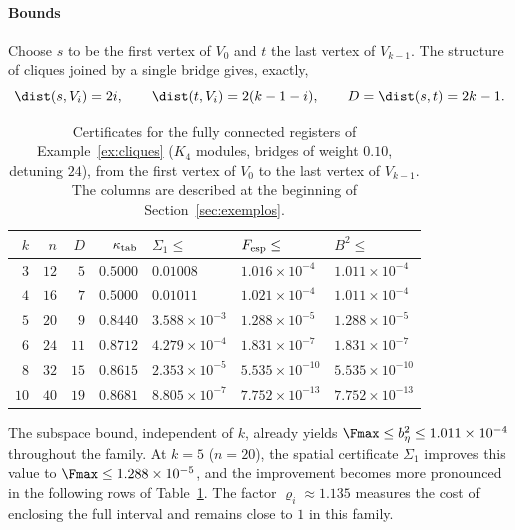 \begin{exemplo}
\paragraph{Bounds}
Choose $s$ to be the first vertex of $V_0$ and $t$ the last vertex of
$V_{k-1}$. The structure of cliques joined by a single bridge gives, exactly,
\[
\dist(s,V_i)=2i,\qquad
\dist(t,V_i)=2(k-1-i),\qquad
D=\dist(s,t)=2k-1.
\]
\begin{table}[t]
\centering
\small
\setlength{\tabcolsep}{4pt}
\caption{Certificates for the fully connected registers of
Example~\ref{ex:cliques} ($K_4$ modules, bridges of weight $0.10$, detuning
$24$), from the first vertex of $V_0$ to the last vertex of $V_{k-1}$. The
columns are described at the beginning of Section~\ref{sec:exemplos}.}
\label{Tab:cliques}
\begin{tabular}{rrrrlll}
\toprule
$k$ & $n$ & $D$ & $\kappa_{\rm tab}$ & $\Sigma_1\le$ & $F_{\rm esp}\le$ & $B^2\le$\\
\midrule
$3$ & $12$ & $5$ & $0.5000$ & $0.01008$ & $1.016\times10^{-4}$ & $1.011\times10^{-4}$\\
$4$ & $16$ & $7$ & $0.5000$ & $0.01011$ & $1.021\times10^{-4}$ & $1.011\times10^{-4}$\\
$5$ & $20$ & $9$ & $0.8440$ & $3.588\times10^{-3}$ & $1.288\times10^{-5}$ & $1.288\times10^{-5}$\\
$6$ & $24$ & $11$ & $0.8712$ & $4.279\times10^{-4}$ & $1.831\times10^{-7}$ & $1.831\times10^{-7}$\\
$8$ & $32$ & $15$ & $0.8615$ & $2.353\times10^{-5}$ & $5.535\times10^{-10}$ & $5.535\times10^{-10}$\\
$10$ & $40$ & $19$ & $0.8681$ & $8.805\times10^{-7}$ & $7.752\times10^{-13}$ & $7.752\times10^{-13}$\\
\bottomrule
\end{tabular}
\end{table}

\noindent The subspace bound, independent of $k$, already yields
$\Fmax\le b_\eta^2\le1.011\times10^{-4}$ throughout the family.
At $k=5$ ($n=20$), the spatial certificate $\Sigma_1$ improves this value to
$\Fmax\le1.288\times10^{-5}$, and the improvement becomes more pronounced in the
following rows of Table~\ref{Tab:cliques}.
The factor $\varrho_i\approx1.135$ measures the cost of enclosing the full interval
and remains close to $1$ in this family.

\end{exemplo}


